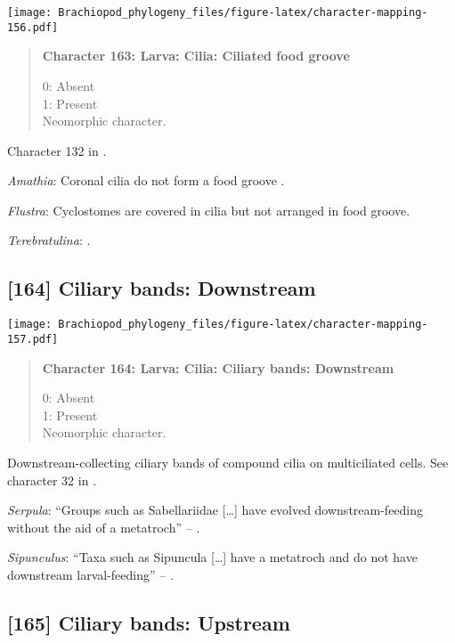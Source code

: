 \documentclass[openany]{book}
\theoremstyle{definition}
\theoremstyle{definition}
\theoremstyle{definition}
\theoremstyle{remark}
\begin{document}
\texttt{[image: Brachiopod\_phylogeny\_files/figure-latex/character-mapping-156.pdf]}

\begin{quote}
\textbf{Character 163: Larva: Cilia: Ciliated food groove}

0: Absent\\
1: Present\\
Neomorphic character.
\end{quote}

Character 132 in \citet{Rouse1999}.

\hypertarget{Amathia-coding-163}{}
\emph{Amathia}: Coronal cilia do not form a food groove
\citep{Reed1982}.

\hypertarget{Flustra-coding-163}{}
\emph{Flustra}: Cyclostomes are covered in cilia but not arranged in
food groove.

\hypertarget{Terebratulina-coding-163}{}
\emph{Terebratulina}: \citet{Williams1997Introduction}.

\subsection*{{[}164{]} Ciliary bands:
Downstream}\label{ciliary-bands-downstream}

\texttt{[image: Brachiopod\_phylogeny\_files/figure-latex/character-mapping-157.pdf]}

\begin{quote}
\textbf{Character 164: Larva: Cilia: Ciliary bands: Downstream}

0: Absent\\
1: Present\\
Neomorphic character.
\end{quote}

Downstream-collecting ciliary bands of compound cilia on multiciliated
cells. See character 32 in \citet{Glenner2004}.

\hypertarget{Serpula-coding-164}{}
\emph{Serpula}: ``Groups such as Sabellariidae {[}\ldots{}{]} have
evolved downstream-feeding without the aid of a metatroch'' --
\citep{Rouse2000}.

\hypertarget{Sipunculus-coding-164}{}
\emph{Sipunculus}: ``Taxa such as Sipuncula {[}\ldots{}{]} have a
metatroch and do not have downstream larval-feeding'' --
\citet{Rouse2000}.

\subsection*{{[}165{]} Ciliary bands:
Upstream}\label{ciliary-bands-upstream}
\end{document}
